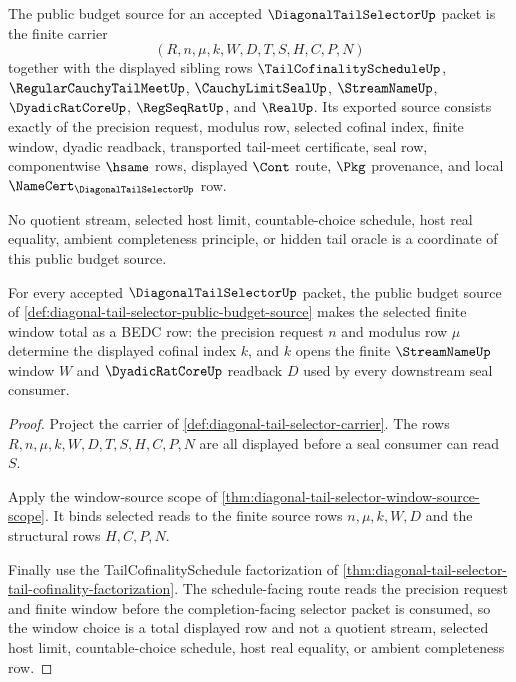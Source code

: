 \begin{definition}
\label{def:diagonal-tail-selector-public-budget-source}
The public budget source for an accepted $\DiagonalTailSelectorUp$ packet is
the finite carrier
$$
(R,n,\mu,k,W,D,T,S,H,C,P,N)
$$
together with the displayed sibling rows
$\TailCofinalityScheduleUp$, $\RegularCauchyTailMeetUp$,
$\CauchyLimitSealUp$, $\StreamNameUp$, $\DyadicRatCoreUp$,
$\RegSeqRatUp$, and $\RealUp$. Its exported source consists exactly of the
precision request, modulus row, selected cofinal index, finite window,
dyadic readback, transported tail-meet certificate, seal row,
componentwise $\hsame$ rows, displayed $\Cont$ route, $\Pkg$ provenance,
and local $\NameCert_{\DiagonalTailSelectorUp}$ row.

No quotient stream, selected host limit, countable-choice schedule, host
real equality, ambient completeness principle, or hidden tail oracle is a
coordinate of this public budget source.
\end{definition}

\begin{theorem}
\label{thm:diagonal-tail-selector-window-choice-totality}
For every accepted $\DiagonalTailSelectorUp$ packet, the public budget
source of \autoref{def:diagonal-tail-selector-public-budget-source} makes
the selected finite window total as a BEDC row: the precision request $n$
and modulus row $\mu$ determine the displayed cofinal index $k$, and $k$
opens the finite $\StreamNameUp$ window $W$ and $\DyadicRatCoreUp$ readback
$D$ used by every downstream seal consumer.
\end{theorem}
\begin{proof}
Project the carrier of \autoref{def:diagonal-tail-selector-carrier}. The
rows $R,n,\mu,k,W,D,T,S,H,C,P,N$ are all displayed before a seal consumer
can read $S$.

Apply the window-source scope of
\autoref{thm:diagonal-tail-selector-window-source-scope}. It binds selected
reads to the finite source rows $n,\mu,k,W,D$ and the structural rows
$H,C,P,N$.

Finally use the TailCofinalitySchedule factorization of
\autoref{thm:diagonal-tail-selector-tail-cofinality-factorization}. The
schedule-facing route reads the precision request and finite window before
the completion-facing selector packet is consumed, so the window choice is a
total displayed row and not a quotient stream, selected host limit,
countable-choice schedule, host real equality, or ambient completeness row.
\end{proof}

